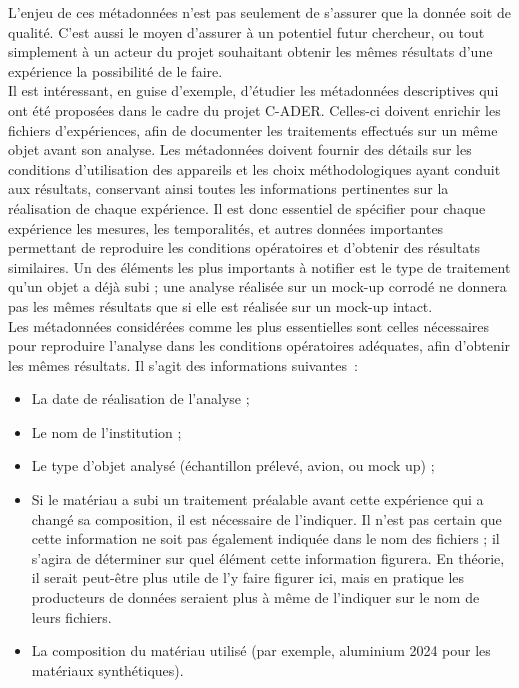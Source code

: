 L’enjeu de ces métadonnées n’est pas seulement de s’assurer que la donnée soit de qualité. C’est aussi le moyen d’assurer à un potentiel futur chercheur, ou tout simplement à un acteur du projet souhaitant obtenir les mêmes résultats d’une expérience la possibilité de le faire.\\

Il est intéressant, en guise d’exemple, d’étudier les métadonnées descriptives qui ont été proposées dans le cadre du projet C-ADER. Celles-ci doivent enrichir les fichiers d’expériences, afin de documenter les traitements effectués sur un même objet avant son analyse. Les métadonnées doivent fournir des détails sur les conditions d’utilisation des appareils et les choix méthodologiques ayant conduit aux résultats, conservant ainsi toutes les informations pertinentes sur la réalisation de chaque expérience. Il est donc essentiel de spécifier pour chaque expérience les mesures, les temporalités, et autres données importantes permettant de reproduire les conditions opératoires et d’obtenir des résultats similaires. Un des éléments les plus importants à notifier est le type de traitement qu’un objet a déjà subi ; une analyse réalisée sur un mock-up corrodé ne donnera pas les mêmes résultats que si elle est réalisée sur un mock-up intact.\\

Les métadonnées considérées comme les plus essentielles sont celles nécessaires pour reproduire l'analyse dans les conditions opératoires adéquates, afin d’obtenir les mêmes résultats. Il s’agit des informations suivantes :\\

\begin{itemize}
    \item La date de réalisation de l’analyse ;
    \item Le nom de l’institution ;
    \item Le type d’objet analysé (échantillon prélevé, avion, ou mock up) ;
    \item Si le matériau a subi un traitement préalable avant cette expérience qui a changé sa composition, il est nécessaire de l’indiquer. Il n'est pas certain que cette information ne soit pas également indiquée dans le nom des fichiers ; il s'agira de déterminer sur quel élément cette information figurera. En théorie, il serait peut-être plus utile de l'y faire figurer ici, mais en pratique les producteurs de données seraient plus à même de l'indiquer sur le nom de leurs fichiers. 
    \item La composition du matériau utilisé (par exemple, aluminium 2024 pour les matériaux synthétiques).
\end{itemize}

